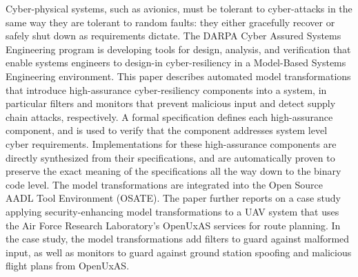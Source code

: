 Cyber-physical systems, such as avionics, must be tolerant to cyber-attacks in the same way they are tolerant to random faults: they either gracefully recover or safely shut down as requirements dictate. The DARPA Cyber Assured Systems Engineering program is developing tools for design, analysis, and verification that enable systems engineers to design-in cyber-resiliency in a Model-Based Systems Engineering environment. This paper describes automated model transformations that introduce high-assurance cyber-resiliency components into a system, in particular filters and monitors that prevent malicious input and detect supply chain attacks, respectively. A formal specification defines each high-assurance component, and is used to verify that the component addresses system level cyber requirements. Implementations for these high-assurance components are directly synthesized from their specifications, and are automatically proven to preserve the exact meaning of the specifications all the way down to the binary code level. The model transformations are integrated into the Open Source AADL Tool Environment (OSATE). The paper further reports on a case study applying security-enhancing model transformations to a UAV system that uses the Air Force Research Laboratory's OpenUxAS services for route planning. In the case study, the model transformations add filters to guard against malformed input, as well as monitors to guard against ground station spoofing and malicious flight plans from OpenUxAS.
